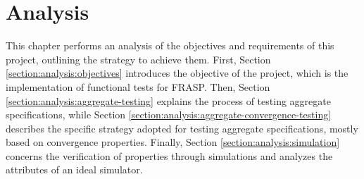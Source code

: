 
\chapter{Analysis}
\label{chapter:analysis}

This chapter performs an analysis of the objectives and requirements of this
project, outlining the strategy to achieve them. First, Section
\ref{section:analysis:objectives} introduces the objective of the project,
which is the implementation of functional tests for FRASP. Then, Section
\ref{section:analysis:aggregate-testing} explains the process of testing
aggregate specifications, while Section
\ref{section:analysis:aggregate-convergence-testing} describes the specific
strategy adopted for testing aggregate specifications, mostly based on
convergence properties. Finally, Section \ref{section:analysis:simulation}
concerns the verification of properties through simulations and analyzes the
attributes of an ideal simulator.





